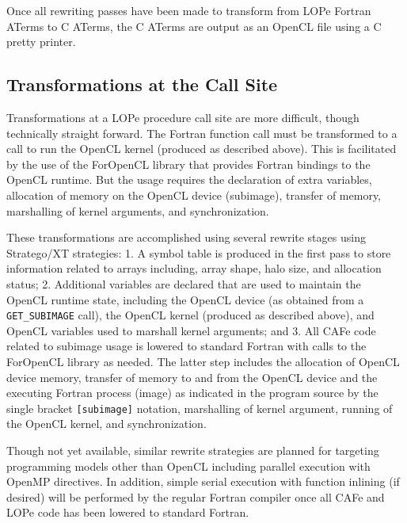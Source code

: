 Once all rewriting passes have been made to transform from LOPe Fortran ATerms to C ATerms, the
C ATerms are output as an OpenCL file using a C pretty printer.

\subsection{Transformations at the Call Site}

Transformations at a LOPe procedure call site are more difficult, though technically straight forward.
The Fortran function call must be transformed to a call to run the OpenCL kernel (produced as described
above).  This is facilitated by the use of the ForOpenCL library that provides Fortran bindings to the
OpenCL runtime\cite{foropencl}.  But the usage requires the declaration of extra variables,
allocation of memory on the OpenCL device (subimage), transfer of memory, marshalling of kernel
arguments, and synchronization.

These transformations are accomplished using several rewrite stages using Stratego/XT strategies:
1. A symbol table is produced in the first pass to store information related to arrays including,
array shape, halo size, and allocation status;
2. Additional variables are declared that are used to maintain the OpenCL runtime state, including
the OpenCL device (as obtained from a \texttt{GET\_SUBIMAGE} call), the OpenCL kernel (produced as
described above), and OpenCL variables used to marshall kernel arguments; and
3. All CAFe code related to subimage usage is lowered to standard Fortran with calls to the
ForOpenCL library as needed.  The latter step includes the allocation of OpenCL device memory,
transfer of memory to and from the OpenCL device and the executing Fortran process (image) as
indicated in the program source by the single bracket \texttt{[subimage]} notation, marshalling
of kernel argument, running of the OpenCL kernel, and synchronization.

Though not yet available, similar rewrite strategies are planned for targeting programming models
other than OpenCL including parallel execution with OpenMP directives.  In addition, simple serial
execution with function inlining (if desired) will be performed by the regular Fortran compiler once
all CAFe and LOPe code has been lowered to standard Fortran.


